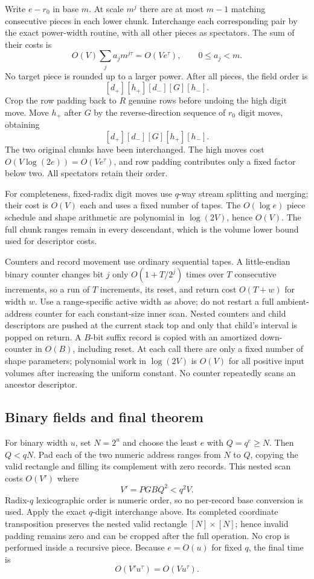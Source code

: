 Write $e-r_0$ in base $m$.  At scale $m^j$ there are at most $m-1$
matching consecutive pieces in each lower chunk.  Interchange each
corresponding pair by the exact power-width routine, with all other
pieces as spectators.  The sum of their costs is
\[
 O(V)\sum_j a_jm^{j\tau}=O(Ve^\tau),\qquad 0\le a_j<m.
\]
No target piece is rounded up to a larger power.  After all pieces,
the field order is
\[
 [d_+][h_+][d_-][G][h_-].
\]
Crop the row padding back to $R$ genuine rows before undoing the high
digit move.  Move $h_+$ after $G$ by the reverse-direction sequence of
$r_0$ digit moves, obtaining
\[
 [d_+][d_-][G][h_+][h_-].
\]
The two original chunks have been interchanged.  The high moves cost
$O(V\log(2e))=O(Ve^\tau)$, and row padding contributes only a fixed
factor below two.  All spectators retain their order.

For completeness, fixed-radix digit moves use $q$-way stream splitting
and merging; their cost is $O(V)$ each and uses a fixed number of tapes.
The $O(\log e)$ piece schedule and shape arithmetic are polynomial in
$\log(2V)$, hence $O(V)$.  The full chunk ranges remain in every
descendant, which is the volume lower bound used for descriptor costs.

Counters and record movement use ordinary sequential tapes.  A
little-endian binary counter changes bit $j$ only $O(1+T/2^j)$ times
over $T$ consecutive increments, so a run of $T$ increments, its reset,
and return cost $O(T+w)$ for width $w$. Use a range-specific active
width as above; do not restart a full ambient-address counter for
each constant-size inner scan. Nested counters and child
descriptors are pushed at the current stack top and only that child's
interval is popped on return.  A $B$-bit suffix record is copied with an
amortized down-counter in $O(B)$, including reset.  At each call there
are only a fixed number of shape parameters; polynomial work in
$\log(2V)$ is $O(V)$ for all positive input volumes after increasing the
uniform constant.  No counter repeatedly scans an ancestor descriptor.

\subsection{Binary fields and final theorem}

For binary width $u$, set $N=2^u$ and choose the least $e$ with
$Q=q^e\ge N$.  Then $Q<qN$.  Pad each of the two numeric address ranges
from $N$ to $Q$, copying the valid rectangle and filling its complement
with zero records.  This nested scan costs $O(V')$ where
\[
 V'=PGBQ^2<q^2V.
\]
Radix-$q$ lexicographic order is numeric order, so no per-record base
conversion is used.  Apply the exact $q$-digit interchange above.  Its
completed coordinate transposition preserves the nested valid rectangle
$[N]\times[N]$; hence invalid padding remains zero and can be cropped
after the full operation.  No crop is performed inside a recursive piece.
Because $e=O(u)$ for fixed $q$, the final time is
\[
                         O(V'u^\tau)=O(Vu^\tau).
\]

